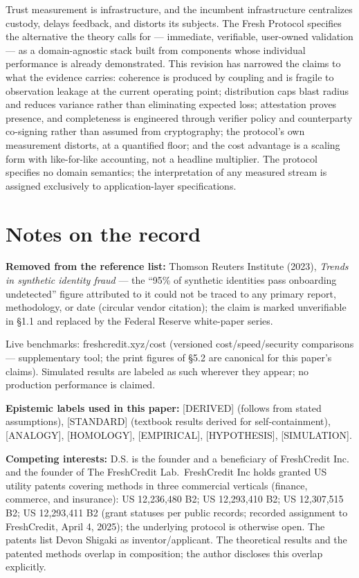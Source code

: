 \documentclass[11pt,twocolumn]{article}
\begin{document}
Trust measurement is infrastructure, and the incumbent infrastructure
centralizes custody, delays feedback, and distorts its subjects. The
Fresh Protocol specifies the alternative the theory calls for ---
immediate, verifiable, user-owned validation --- as a domain-agnostic
stack built from components whose individual performance is already
demonstrated. This revision has narrowed the claims to what the evidence
carries: coherence is produced by coupling and is fragile to observation
leakage at the current operating point; distribution caps blast radius
and reduces variance rather than eliminating expected loss; attestation
proves presence, and completeness is engineered through verifier policy
and counterparty co-signing rather than assumed from cryptography; the
protocol's own measurement distorts, at a quantified floor; and the cost
advantage is a scaling form with like-for-like accounting, not a
headline multiplier. The protocol specifies no domain semantics; the
interpretation of any measured stream is assigned exclusively to
application-layer specifications.


\FloatBarrier
\section*{Notes on the record}

\textbf{Removed from the reference list:} Thomson Reuters Institute
(2023), \emph{Trends in synthetic identity fraud} --- the ``95\% of
synthetic identities pass onboarding undetected'' figure attributed to
it could not be traced to any primary report, methodology, or date
(circular vendor citation); the claim is marked unverifiable in §1.1 and
replaced by the Federal Reserve white-paper series.

Live benchmarks:
freshcredit.xyz/cost (versioned cost/speed/security comparisons ---
supplementary tool; the print figures of §5.2 are canonical for this
paper's claims). Simulated results are labeled as such wherever they
appear; no production performance is claimed.

\textbf{Epistemic labels used in this paper:} {[}DERIVED{]} (follows
from stated assumptions), {[}STANDARD{]} (textbook results derived for
self-containment), {[}ANALOGY{]}, {[}HOMOLOGY{]}, {[}EMPIRICAL{]},
{[}HYPOTHESIS{]}, {[}SIMULATION{]}.

\textbf{Competing interests:} D.S. is the founder and a beneficiary of FreshCredit Inc. and the
founder of The FreshCredit Lab.~FreshCredit Inc holds granted US utility
patents covering methods in three commercial verticals (finance,
commerce, and insurance): US 12,236,480 B2; US 12,293,410 B2; US
12,307,515 B2; US 12,293,411 B2 (grant statuses per public records;
recorded assignment to FreshCredit, April 4, 2025); the
underlying protocol is otherwise open. The patents list Devon Shigaki as
inventor/applicant. The theoretical results and the
patented methods overlap in composition; the author discloses this
overlap explicitly.
\end{document}
